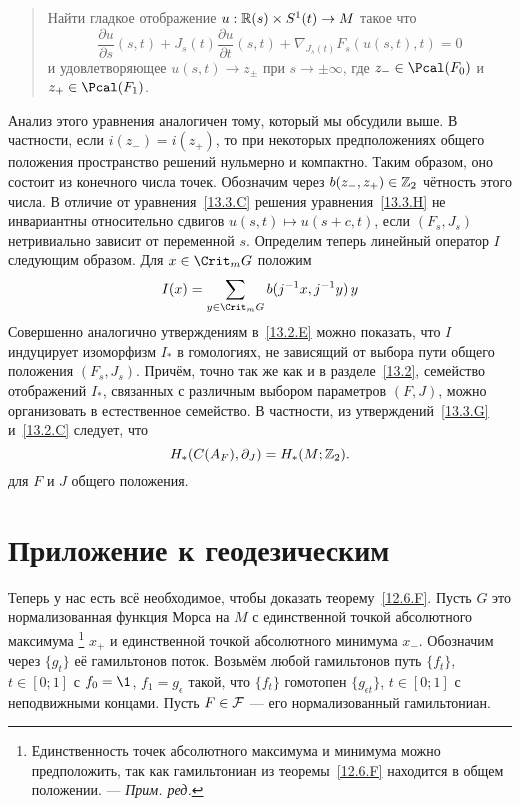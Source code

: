 \begin{quote}
  Найти гладкое отображение $u:\mathbb{R}(s)\times S^{1}(t)\to M$
  такое что 
  \begin{equation}\label{13.3.H}
    \frac{\partial u}{\partial s}(s,t)+
    J_{s}(t)\frac{\partial u}{\partial t}(s,t) +
    \nabla_{J_{s}(t)}F_{s}(u(s,t),t) = 0
  \end{equation}
  и удовлетворяющее $u(s,t)\to z_{\pm}$ при $s\to\pm\infty$, где
  $z_{-}\in\Pcal(F_{0})$ и $z_{+}\in\Pcal(F_{1})$.
\end{quote}
Анализ этого уравнения аналогичен тому, который мы обсудили выше.
В частности, если $i(z_{-})=i(z_{+})$, то при некоторых предположениях
общего положения пространство решений нульмерно и компактно. 
Таким образом, оно состоит из конечного числа точек.
Обозначим через $b(z_{-},z_{+})\in\mathbb{Z}_{2}$ чётность этого числа.
В отличие от уравнения~\ref{13.3.C} решения
уравнения~\ref{13.3.H} не инвариантны относительно сдвигов
$u(s,t)\mapsto u(s+c,t)$, если $(F_{s}, J_{s})$ нетривиально зависит
от переменной $s$.
Определим теперь линейный оператор $I$ следующим образом.
Для $x\in\Crit_{m}G$ положим
\begin{equation}
I(x) = \sum_{y\in\Crit_{m}G}b(j^{-1}x,j^{-1}y)\,y
\label{13.3.I}
\end{equation}
Совершенно аналогично утверждениям в~\ref{13.2.E} можно показать, что
$I$ индуцирует изоморфизм $I_{*}$ в гомологиях, не зависящий от выбора
пути общего положения $(F_{s}, J_{s})$. 
Причём, точно так же как и в разделе~\ref{13.2}, семейство отображений
$I_{*}$, связанных с различным выбором параметров $(F,J)$, можно
организовать в естественное семейство.
В частности, из утверждений~\ref{13.3.G} и~\ref{13.2.C} следует,
что 
\[
H_{*}(C(A_{F}),\partial_{J}) = H_{*}(M;\mathbb{Z}_{2}).
\]
для $F$ и $J$ общего положения.

\section{Приложение к геодезическим}\label{sec:13.4}

Теперь у нас есть всё необходимое, чтобы доказать теорему~\ref{12.6.F}.
Пусть $G$ это нормализованная функция Морса на $M$ с
единственной
точкой абсолютного максимума
\footnote{Единственность точек абсолютного
максимума и минимума можно предположить, так как гамильтониан из
теоремы~\ref{12.6.F} находится в общем положении. — \textit{Прим. ред.}} $x_{+}$ и единственной точкой абсолютного
минимума $x_{-}$. 
Обозначим через $\{g_{t}\}$ её гамильтонов поток.
Возьмём любой гамильтонов путь $\{f_{t}\}$, $t\in[0;1]$ с $f_{0}=\1$,
$f_{1}=g_{\epsilon}$ такой, что $\{f_{t}\}$ гомотопен $\{g_{\epsilon
t}\}$, $t\in[0;1]$ с неподвижными концами.
Пусть $F\in\mathcal{F}$ — его нормализованный гамильтониан.

